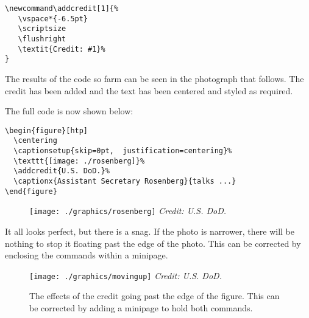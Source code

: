 \begin{verbatim}
\newcommand\addcredit[1]{%
   \vspace*{-6.5pt}
   \scriptsize
   \flushright
   \textit{Credit: #1}%
}
\end{verbatim}
\newcommand\addcredit[1]{%
 \vspace*{-6.5pt}
 \scriptsize%
 \flushright%
 \textit{Credit: #1}%
}

The results of the code so farm can be seen in the photograph that follows. The credit has been added and
the text has been centered and styled as required.

The full code is now shown below:

\begin{verbatim}
\begin{figure}[htp]
  \centering
  \captionsetup{skip=0pt,  justification=centering}%
  \texttt{[image: ./rosenberg]}%
  \addcredit{U.S. DoD.}%
  \captionx{Assistant Secretary Rosenberg}{talks ...}
\end{figure}
\end{verbatim}

\begin{figure}[htp]
  \centering
  \captionsetup{figurename=Photo, labelsep=period, skip=0pt, position=top, textfont=scriptsize,    justification=centering}%
\texttt{[image: ./graphics/rosenberg]}%
\addcredit{U.S. DoD.}%
\vspace{10pt}
\end{figure}

It all looks perfect, but there is a snag. If the photo is narrower, there will be nothing to stop it floating past the edge of the photo. This can be corrected by enclosing the commands within a minipage.


\begin{figure}[htp]
\captionsetup{figurename=Fig., labelsep=period}%
\texttt{[image: ./graphics/movingup]}%
\addcredit{U.S. DoD.}%
\caption{The effects of the credit going past the edge of the figure. This can be corrected by adding a minipage to hold both commands. }
\end{figure}



